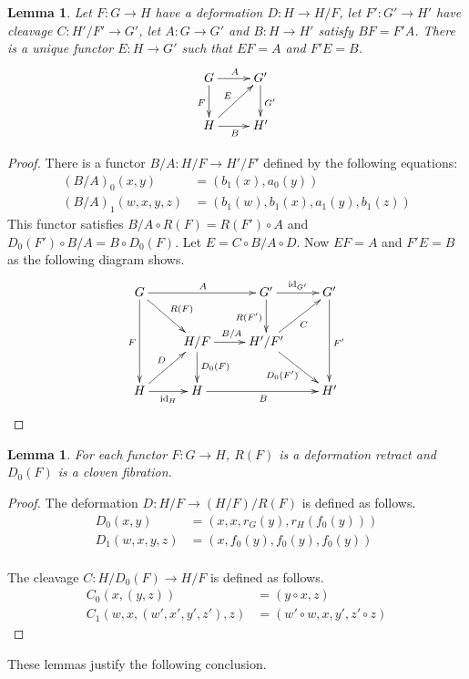 \documentclass{amsart}
\theoremstyle{plain}
\newtheorem{lemma}[theorem]{Lemma}
\theoremstyle{definition}
\newcommand\hide[1]{}
\newcommand\id{\mathrm{id}}
\begin{document}
\begin{lemma} Let $F:G\to H$ have a deformation $D:H\to H/F$, let $F':G'\to H'$ have cleavage $C:H'/F'\to G'$, let $A:G\to G'$ and $B:H\to H'$ satisfy $BF = F'A$. There is a unique functor $E:H\to G'$ such that $EF = A$ and $F'E = B$.
\[\xymatrix{
G \ar[d]_F \ar[r]^A & G'\ar[d]^{G'} \\
H\ar[r]_B \ar[ur]^E & H'
}\]
\end{lemma}

\begin{proof} There is a functor $B/A:H/F \to H'/F'$ defined by the following equations:
\begin{align*}
(B/A)_0(x,y) &= (b_1(x), a_0(y))\\
(B/A)_1(w,x,y,z) &= (b_1(w),b_1(x),a_1(y),b_1(z))
\end{align*}
This functor satisfies $B/A \circ R(F) = R(F')\circ A$ and $D_0(F')\circ B/A = B\circ D_0(F)$. Let $E = C\circ B/A \circ D$. Now $EF =  A$ and $F'E = B$ as the following diagram shows.
\[\xymatrix{
G \ar[rr]^A \ar[dd]_F \ar[dr]^{R(F)} && G'\ar[d]_{R(F')} \ar[r]^{\id_{G'}} & G' \ar[dd]^{F'}\\
& H/F \ar[r]^{B/A}\ar[d]^{D_0(F)} & H'/F' \ar[ur]_C \ar[dr]_{D_0(F')} \\
H \ar[r]_{\id_H} \ar[ur]^D & H \ar[rr]_B && H'
}\]
\end{proof}

\begin{lemma} For each functor $F:G\to H$, $R(F)$ is a deformation retract and $D_0(F)$ is a cloven fibration. \end{lemma}

\begin{proof} The deformation $D:H/F \to (H/F)/R(F)$ is defined as follows.
\begin{align*}
D_0(x,y) &= (x,x,r_G(y),r_H(f_0(y))) \\
D_1(w,x,y,z) &= (x,f_0(y),f_0(y),f_0(y))\\
\end{align*}\hide{Dit is bijna niet te doen: zestien elementen zijn ook met een hoop overlap te veel}

The cleavage $C: H/D_0(F) \to H/F$ is defined as follows.
\begin{align*} 
C_0(x,(y,z)) &= (y\circ x, z) \\
C_1(w,x,(w',x',y',z'),z) &= (w'\circ w, x, y',z'\circ z)
\end{align*}
\end{proof}

These lemmas justify the following conclusion.
\end{document}
